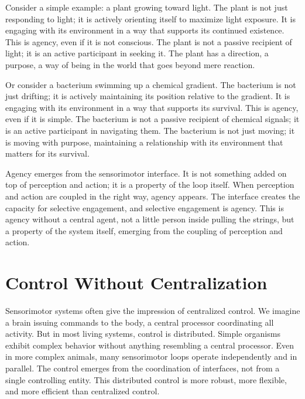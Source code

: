 \documentclass[
  openright]{book}
\begin{document}
Consider a simple example: a plant growing toward light. The plant is
not just responding to light; it is actively orienting itself to
maximize light exposure. It is engaging with its environment in a way
that supports its continued existence. This is agency, even if it is not
conscious. The plant is not a passive recipient of light; it is an
active participant in seeking it. The plant has a direction, a purpose,
a way of being in the world that goes beyond mere reaction.

Or consider a bacterium swimming up a chemical gradient. The bacterium
is not just drifting; it is actively maintaining its position relative
to the gradient. It is engaging with its environment in a way that
supports its survival. This is agency, even if it is simple. The
bacterium is not a passive recipient of chemical signals; it is an
active participant in navigating them. The bacterium is not just moving;
it is moving with purpose, maintaining a relationship with its
environment that matters for its survival.

Agency emerges from the sensorimotor interface. It is not something
added on top of perception and action; it is a property of the loop
itself. When perception and action are coupled in the right way, agency
appears. The interface creates the capacity for selective engagement,
and selective engagement is agency. This is agency without a central
agent, not a little person inside pulling the strings, but a property of
the system itself, emerging from the coupling of perception and action.

\section{Control Without
Centralization}\label{control-without-centralization}

Sensorimotor systems often give the impression of
centralized control. We imagine a brain
issuing commands to the body, a central processor coordinating all
activity. But in most living systems, control is
distributed. Simple organisms exhibit complex
behavior without anything resembling a central processor. Even in more
complex animals, many sensorimotor loops operate independently and in
parallel. The control emerges from the coordination of interfaces, not
from a single controlling entity. This
distributed control is more robust, more
flexible, and more efficient than centralized
control.
\end{document}
